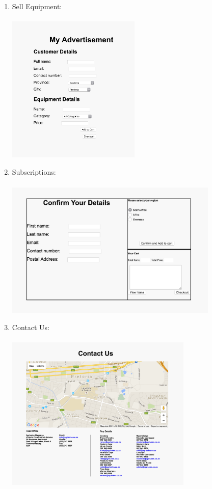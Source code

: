 \documentclass[11pt]{article}
\begin{document}
\begin{enumerate}
		\item Sell Equipment: \\ \\
		\includegraphics[width=0.5\textwidth]{../Images/Pages/SellEquipment}
		\item Subscriptions: \\ \\
			\includegraphics[width=0.8\textwidth]{../Images/Pages/Subscriptions} \newpage
		\item Contact Us: \\ \\
			\includegraphics[width=0.7\textwidth]{../Images/Pages/ContactUs}
	\end{enumerate}
\end{document}
